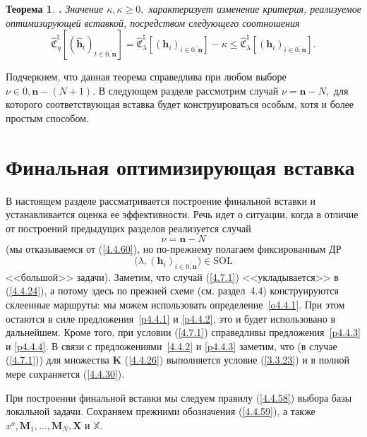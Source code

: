 \documentclass[11pt,twoside,openany]{report}
\newcommand{\bfn}{\begin{equation}}
\newcommand{\efn}{\end{equation}}
\newcommand{\ov}{\overline}
\newcounter{theo}
\newtheorem{theo}{Теорема}[section]
\newcommand{\TL}{\mbox{\bf{$\!\!$.}}}
\newcommand{\la}{\lambda}
\newcommand{\nn}{{\mathbf n}}
\begin{document}
{{\begin{theo}\label{t4.6.1}{\TL} Значение $\kappa, \kappa \geqslant 0,$ характеризует изменение
критерия, реализуемое оптимизирующей вставкой, посредством следующего соотношения
$$
\widehat{\mathfrak{C}}_\eta^\natural[(\hat{\mathbf{h}}_t)_{t\in\ov{0,\nn}}] =
\widehat{\mathfrak{C}}_\la^\natural[(\mathbf{h}_i)_{i\in\ov{0,\nn}}]  - \kappa \leqslant
\widehat{\mathfrak{C}}_\la^\natural[(\mathbf{h}_i)_{i\in\ov{0,\nn}}].
$$
\end{theo}

Подчеркнем, что данная теорема справедлива при любом выборе $\nu\in \ov{0,\nn-(N+1)}.$
В следующем разделе рассмотрим случай $\nu= \nn-N,$ для которого соответствующая вставка
будет конструироваться особым, хотя и более простым способом.

{\raggedright\section{
  Финальная оптимизирующая вставка
}}
\label{sect:4.7}
\setcounter{equation}{0}

В настоящем разделе рассматривается построение финальной вставки и устанавливается
оценка ее эффективности. Речь идет о ситуации, когда в отличие от построений предыдущих
разделов реализуется случай
\bfn\label{4.7.1}\nu =\nn - N
\efn
(мы отказываемся от (\ref{4.4.60}), но по-прежнему полагаем фиксированным ДР
$$\bigl(\la,(\mathbf{h}_i)_{i\in\ov{0,\nn}}\bigl)\in \mathrm{SOL}
$$
<<большой>> задачи). Заметим, что случай (\ref{4.7.1}) <<укладывается>> в (\ref{4.4.24}),
а потому здесь по прежней схеме (см. раздел~4.4) конструируются склеенные маршруты: мы
можем использовать определение~\ref{o4.4.1}. При этом остаются в силе
предложения~\ref{p4.4.1} и \ref{p4.4.2}, это и будет использовано в дальнейшем. Кроме
того, при условии (\ref{4.7.1}) справедливы предложения~\ref{p4.4.3} и \ref{p4.4.4}.
В связи с предложениями~\ref{4.4.2} и \ref{p4.4.3} заметим, что (в случае (\ref{4.7.1}))
для множества $\mathbf{K}$ (\ref{4.4.26}) выполняется условие (\ref{3.3.23}) и в полной
мере сохраняется (\ref{4.4.30}).

При построении финальной вставки мы следуем правилу (\ref{4.4.58}) выбора базы локальной
задачи. Сохраняем прежними обозначения (\ref{4.4.59}), а также $x^o,\mathbf{M}_1,\ldots,
\mathbf{M}_N,\mathbf{X}$ и $\mathbb{X}.$

}}
\end{document}
